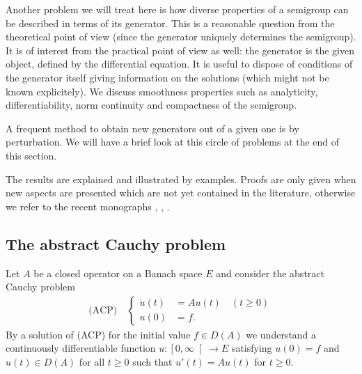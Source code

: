 Another problem we will treat here is how diverse properties of a semigroup can be described in terms of its generator.
This is a reasonable question from the theoretical point of view (since the generator uniquely determines the semigroup).
It is of interest from the practical point of view as well: the generator is the given object, defined by the differential equation.
It is useful to dispose of conditions of the generator itself giving information on the solutions (which might not be known explicitely).
We discuss smoothness properties such as analyticity, differentiability, norm continuity and compactness of the semigroup.

A frequent method to obtain new generators out of a given one is by perturbation.
We will have a brief look at this circle of problems at the end of this section.

The results are explained and illustrated by examples.
Proofs are only given when new aspects are presented which are not yet contained in the literature, otherwise we refer to the recent monographs \citet{davies:1980}, \citet{goldstein:1985a}, \citet{pazy:1983}.
\subsection{The abstract Cauchy problem} \label{subsec:a2-1.se1}
Let $A$ be a closed operator on a Banach space $E$ and consider the abstract Cauchy problem
\begin{align*}
\text{(ACP)} \quad \begin{cases}
    \dot{u}(t) &= Au(t) \quad (t \geq 0) \\
    u(0) &= f .
\end{cases}
\end{align*}
By a solution of (ACP) for the initial value $f \in D(A)$ we understand a continuously differentiable function $u \colon \left[0,\infty\right[ \to E$ satisfying $u(0) = f$ and $u(t) \in D(A)$ for all $t \geq 0$ such that $u'(t) = Au(t)$ for $t \geq 0$.

